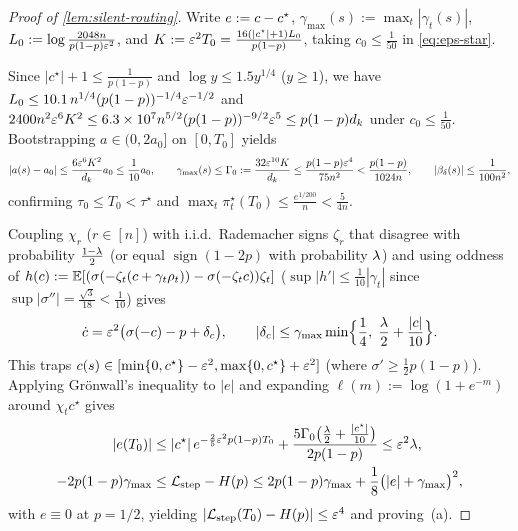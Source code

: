 \begin{proof}[Proof of \cref{lem:silent-routing}]
Write $e := c - c^\star$, $\gamma_{\max}(s) := \max_t|\gamma_t(s)|$, $L_0 := \log\frac{2048n}{p(1-p)\varepsilon^2}$, and $K := \varepsilon^2 T_0 = \frac{16(|c^\star|+1)L_0}{p(1-p)}$, taking $c_0 \le \frac{1}{50}$ in \cref{eq:eps-star}.

Since $|c^\star| + 1 \le \frac{1}{p(1-p)}$ and $\log y \le 1.5 y^{1/4}$ ($y \ge 1$), we have $L_0 \le 10.1\,n^{1/4}(p(1-p))^{-1/4}\varepsilon^{-1/2}$ and $2400 n^2\varepsilon^6 K^2 \le 6.3\times 10^7 n^{5/2}(p(1-p))^{-9/2}\varepsilon^5 \le p(1-p)d_k$ under $c_0 \le \frac{1}{50}$. Bootstrapping $a \in (0, 2a_0]$ on $[0, T_0]$ yields
\[
  \lvert a(s) - a_0\rvert \le \frac{6\varepsilon^6 K^2}{d_k}a_0 \le \frac{1}{10}a_0, \qquad
  \gamma_{\max}(s) \le \Gamma_0 := \frac{32\varepsilon^{10}K}{d_k} \le \frac{p(1-p)\varepsilon^4}{75n^2} < \frac{p(1-p)}{1024n}, \qquad
  \lvert\beta_\delta(s)\rvert \le \frac{1}{100n^2},
\]
confirming $\tau_0 \le T_0 < \tau^\star$ and $\max_t\pi_t^\star(T_0) \le \frac{e^{1/200}}{n} < \frac{5}{4n}$.

Coupling $\chi_r$ ($r \in [n]$) with i.i.d.\ Rademacher signs $\zeta_r$ that disagree with probability $\frac{1-\lambda}{2}$ (or equal $\operatorname{sign}(1-2p)$ with probability $\lambda$) and using oddness of $h(c) := \mathbb E[(\sigma(-\zeta_t(c+\gamma_t\rho_t)) - \sigma(-\zeta_tc))\zeta_t]$ ($\sup|h'| \le \frac{1}{10}|\gamma_t|$ since $\sup|\sigma''| = \frac{\sqrt 3}{18} < \frac{1}{10}$) gives
\[
  \dot{c} = \varepsilon^2\bigl(\sigma(-c) - p + \delta_c\bigr), \qquad
  \lvert\delta_c\rvert \le \gamma_{\max}\min\Bigl\{\frac{1}{4},\; \frac{\lambda}{2} + \frac{|c|}{10}\Bigr\}.
\]
This traps $c(s) \in [\min\{0,c^\star\}-\varepsilon^2, \max\{0,c^\star\}+\varepsilon^2]$ (where $\sigma' \ge \frac{1}{2}p(1-p)$). Applying Gr\"onwall's inequality to $|e|$ and expanding $\ell(m) := \log(1+e^{-m})$ around $\chi_t c^\star$ gives
\begin{align*}
  |e(T_0)| &\le |c^\star|\,e^{-\frac{2}{5}\varepsilon^2 p(1-p)T_0} + \frac{5\Gamma_0\bigl(\frac{\lambda}{2} + \frac{|c^\star|}{10}\bigr)}{2p(1-p)} \le \varepsilon^2\lambda,\\
  -2p(1-p)\gamma_{\max} &\le \mathcal L_{\mathrm{step}} - H(p) \le 2p(1-p)\gamma_{\max} + \frac{1}{8}\bigl(|e| + \gamma_{\max}\bigr)^2,
\end{align*}
with $e \equiv 0$ at $p = 1/2$, yielding $|\mathcal L_{\mathrm{step}}(T_0) - H(p)| \le \varepsilon^4$ and proving~(a).


\end{proof}
